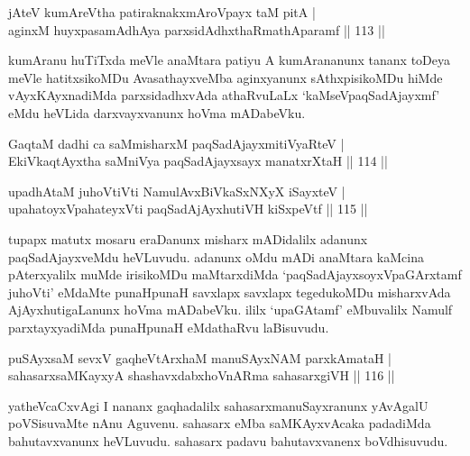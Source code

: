 \begin{shl}
jAteV kumAreV\s tha patiraknakxmAroVpayx taM pitA | \\
aginxM huyxpasamAdhAya parxsidAdhxthaRmathAparamf \hfill|| 113 || 
\end{shl}

\begin{artha}
kumAranu huTiTxda meVle anaMtara patiyu A kumArananunx tananx toDeya 
meVle hatitxsikoMDu AvasathayxveMba aginxyanunx sAthxpisikoMDu hiMde 
vAyxKAyxnadiMda parxsidadhxvAda athaRvuLaLx `kaMseVpaqSadAjayxmf' eMdu 
heVLida darxvayxvanunx hoVma mADabeVku.
\end{artha}


\begin{shl}
GaqtaM dadhi ca saMmisharxM paqSadAjayxmitiVyaRteV | \\
EkiVkaqtAyxtha saMniVya paqSadAjayxsayx manatxrXtaH \hfill|| 114 || 
\end{shl}

\begin{shl}
upadhAtaM juhoVtiVti NamulAvx\s \s BiVkaSxNXyX iSayxteV | \\
upahatoyxVpahateyxVti paqSadAjAyxhutiVH kiSxpeVtf \hfill|| 115 || 
\end{shl}

\begin{artha}
tupapx matutx mosaru eraDanunx misharx mADidalilx adanunx 
paqSadAjayxveMdu heVLuvudu. adanunx oMdu mADi anaMtara kaMcina 
pAterxyalilx muMde irisikoMDu maMtarxdiMda `paqSadAjayxsoyxVpaGArxtamf 
juhoVti' eMdaMte punaHpunaH savxlapx savxlapx tegedukoMDu misharxvAda AjAyxhutigaLanunx hoVma mADabeVku. ililx `upaGAtamf' eMbuvalilx Namulf 
parxtayxyadiMda punaHpunaH eMdathaRvu laBisuvudu.
\end{artha}

\begin{shl}
puSAyxsaM sevxV gaqheV\s tArxhaM manuSAyxNAM parxkAmataH | \\
sahasarxsaMKayxyA shashavxdabxhoVnARma sahasarxgiVH \hfill|| 116 || 
\end{shl}

\begin{artha}
yatheVcaCxvAgi I nananx gaqhadalilx sahasarxmanuSayxranunx yAvAgalU 
poVSisuvaMte nAnu Aguvenu. sahasarx eMba saMKAyxvAcaka padadiMda 
bahutavxvanunx heVLuvudu. sahasarx padavu bahutavxvanenx boVdhisuvudu.
\end{artha}

